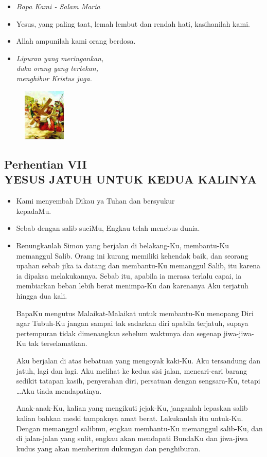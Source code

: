 \documentclass[a5paper,headsepline,titlepage,10pt,nnormalheadings,DIVcalc]{scrbook}
\newcommand{\BU}[1]{\begin{itemize} \item[U:] #1 \end{itemize}}
\newcommand{\BP}[1]{\begin{itemize} \item[P:] #1 \end{itemize}}
\newcommand{\kamiMenyembah}{\BP{ Kami menyembah Dikau ya Tuhan dan bersyukur\\kepadaMu.}
\BU{ Sebab dengan salib suciMu, Engkau telah menebus dunia.}
}
\newcommand{\kasihanilahKami}{\BP{Yesus, yang paling taat, lemah lembut dan rendah hati, kasihanilah kami.}
\BU{Allah ampunilah kami orang berdosa.}}
\begin{document}
\large\begin{itemize}\item[~]\it{Bapa Kami - Salam Maria}\end{itemize}\normalsize
\kasihanilahKami
 
\begin{itemize}
\item[7.] \it{
Lipuran yang meringankan,\\ 
	duka orang yang tertekan,\\ 
	menghibur Kristus juga.
}
\end{itemize}

\begin{figure}
\includegraphics[width=2cm]{jalansalib_files/07_small.jpg}
\end{figure}

\subsection*{Perhentian VII\\
YESUS JATUH UNTUK KEDUA KALINYA}

\kamiMenyembah

\BP{Renungkanlah Simon yang berjalan di belakang-Ku, membantu-Ku memanggul Salib. Orang ini kurang memiliki kehendak baik, dan seorang upahan sebab jika ia datang dan membantu-Ku memanggul Salib, itu karena ia dipaksa melakukannya. Sebab itu, apabila ia merasa terlalu capai, ia membiarkan beban lebih berat menimpa-Ku dan karenanya Aku terjatuh hingga dua kali.

BapaKu mengutus Malaikat-Malaikat untuk membantu-Ku menopang Diri agar Tubuh-Ku jangan sampai tak sadarkan diri apabila terjatuh, supaya pertempuran tidak dimenangkan sebelum waktunya dan segenap jiwa-jiwa-Ku tak terselamatkan.

Aku berjalan di atas bebatuan yang mengoyak kaki-Ku. Aku tersandung dan jatuh, lagi dan lagi. Aku melihat ke kedua sisi jalan, mencari-cari barang sedikit tatapan kasih, penyerahan diri, persatuan dengan sengsara-Ku, tetapi  \dots  Aku tiada mendapatinya.

Anak-anak-Ku, kalian yang mengikuti jejak-Ku, janganlah lepaskan salib kalian bahkan meski tampaknya amat berat. Lakukanlah itu untuk-Ku. Dengan memanggul salibmu, engkau membantu-Ku memanggul salib-Ku, dan di jalan-jalan yang sulit, engkau akan mendapati BundaKu dan jiwa-jiwa kudus yang akan memberimu dukungan dan penghiburan. }
\end{document}
